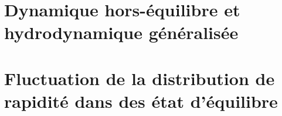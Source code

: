 \chapter{Dynamique hors-équilibre et hydrodynamique généralisée}
\minitoc





\chapter{Fluctuation de la distribution de rapidité dans des état d'équilibre} 



